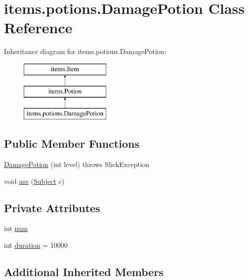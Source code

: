 \hypertarget{classitems_1_1potions_1_1_damage_potion}{}\section{items.\+potions.\+Damage\+Potion Class Reference}
\label{classitems_1_1potions_1_1_damage_potion}
Inheritance diagram for items.\+potions.\+Damage\+Potion\+:\begin{figure}[H]
\begin{center}
\leavevmode
\includegraphics[height=3.000000cm]{classitems_1_1potions_1_1_damage_potion}
\end{center}
\end{figure}
\subsection*{Public Member Functions}
\begin{DoxyCompactItemize}
\item 
\mbox{\hyperlink{classitems_1_1potions_1_1_damage_potion_a9d1f05ff48a0dba21732d396c442c2af}{Damage\+Potion}} (int level)  throws Slick\+Exception 
\item 
void \mbox{\hyperlink{classitems_1_1potions_1_1_damage_potion_a5ad48837266e61f13c6c1d2ac7321133}{use}} (\mbox{\hyperlink{classentities_1_1_subject}{Subject}} c)
\end{DoxyCompactItemize}
\subsection*{Private Attributes}
\begin{DoxyCompactItemize}
\item 
int \mbox{\hyperlink{classitems_1_1potions_1_1_damage_potion_a0278c2e62e2d1bea2ee348110474d812}{num}}
\item 
int \mbox{\hyperlink{classitems_1_1potions_1_1_damage_potion_a0d769ebd1b8063daafe958a488fb4174}{duration}} = 10000
\end{DoxyCompactItemize}
\subsection*{Additional Inherited Members}


